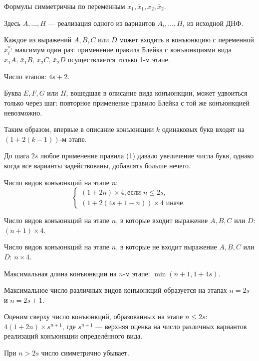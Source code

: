 \documentclass[12pt,a4paper,oneside,fleqn,leqno]{article}
\theoremstyle{definition}
\begin{document}
			Формулы симметричны по переменным $x_1, \bar{x}_1, x_2, \bar{x}_2.$\par
			Здесь $A, \ldots, H$ --- реализация одного из вариантов $A_i, \ldots, H_i$ из исходной ДНФ.\par
			Каждое из выражений $A, B, C$ или $D$ может входить в конъюнкцию с переменной $x_i^{\sigma_i}$ максимум один раз: применение правила Блейка с конъюнкциями вида $x_1A,\,\bar{x}_1B, \,x_2C, \,\bar{x}_2D$ осуществляется только 1-м этапе. \par
			Число этапов: $4s + 2.$\par
			Буква $E, F, G$ или $H$, вошедшая в описание вида конъюнкции, может удвоиться только через шаг: повторное применение правило Блейка с той же конъюнкцией невозможно.\par
			Таким образом, впервые в описание конъюнкции $k$ одинаковых букв входят на $(1 + 2(k - 1))$-м этапе.\par
			До шага $2s$ любое применение правила (1) давало увеличение числа букв, однако когда все варианты задействованы, добавлять больше нечего.\par
			Число видов конъюнкций на этапе $n$: 
			$$
				\begin{cases}
					(1 + 2n)\times4, \text{если $n \leqslant 2s,$}\\
					(1 + 2(4s + 1 - n))\times4 \text{ иначе.}
				\end{cases}
			$$\par
			Число видов конъюнкций на этапе $n$, в которые входит выражение $A, B, C$ или $D$: $(n + 1)\times4.$\par
			Число видов конъюнкций на этапе $n$, в которые не входит выражение $A, B, C$ или $D$: $n\times4.$\par
			Максимальная длина конъюнкции на $n$-м этапе: $\min(n + 1, 1 + 4s)$.\par
			Максимальное число различных видов конъюнкций образуется на этапах $n = 2s$ и $n = 2s + 1$.\par
			Оценим сверху число конъюнкций, образованных на этапе $n \leqslant 2s$: $4(1 + 2n) \times s^{n + 1}$, где $s^{n + 1}$ --- верхняя оценка на число различных вариантов реализаций конъюнкции определённого вида.\par
			При $n > 2s$ число симметрично убывает.\par
\end{document}
